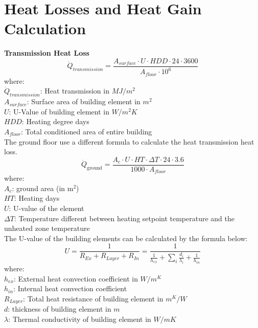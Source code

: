 \documentclass[a4paper, oneside]{discothesis}
\begin{document}
\appendix
\chapter{Heat Losses and Heat Gain Calculation}

			\textbf{Transmission Heat Loss}\\

				\[\dot{Q}_{transmission} =\frac{ A_{surface} \cdot U \cdot HDD \cdot 24 \cdot 3600}{A_{floor} \cdot 10^6}\]
				where:\\
				$\dot{Q}_{transmission}$: Heat transmission in $MJ/m^2$\\
				$A_{surface}$: Surface area of building element in $m^2$\\
				$U$: U-Value of building element in $ W/m^2K$\\
				$HDD$: Heating degree days\\
				$A_{floor}$: Total conditioned area of entire building\\

				The ground floor use a different formula to calculate the heat transmission heat loss.
				\[\dot{Q}_{\text{ground}} = \frac{ A_{c} \cdot U \cdot HT \cdot \Delta T \cdot 24 \cdot 3.6}{1000 \cdot A_{floor}}\]
				where:\\
				$A_c$: ground area (in m$^2$)\\
				$HT$: Heating days\\
				$U$: U-value of the element\\
				$\Delta T$: Temperature different between heating setpoint temperature and the unheated zone temperature\\

				The U-value of the building elements can be calculated by the formula below: \\
				\[U = \frac{1}{R_{Ex}+R_{Layer}+R_{In}} = \frac{1}{\frac{1}{h_{ex}}+\sum_{i}\frac{d_i}{\lambda_i} + \frac{1}{h_{in}}}\]
				where:\\
				$h_{ex}$: External heat convection coefficient in $W/m^K$\\
				$h_{in}$: Internal heat convection coefficient\\
				$R_{Layer}$: Total heat resistance of building element in $m^K/W$\\
				$d$: thickness of building element in $m$\\
				$\lambda$: Thermal conductivity of building element in $W/mK$\\
\end{document}
